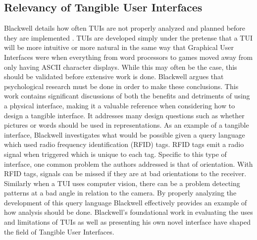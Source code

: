 \subsection{Relevancy of Tangible User Interfaces}

Blackwell details how often TUIs are not properly analyzed and planned before they are implemented \cite{Blackwell}.  TUIs are developed simply under the pretense that a TUI will be more intuitive or more natural in the same way that Graphical User Interfaces were when everything from word processors to games moved away from only having ASCII character displays.  While this may often be the case, this should be validated before extensive work is done.  Blackwell argues that psychological research must be done in order to make these conclusions.   This work contains significant discussions of both the benefits and detriments of using a physical interface, making it a valuable reference when considering how to design a tangible interface.  It addresses many design questions such as whether pictures or words should be used in representations.  As an example of a tangible interface, Blackwell investigates what would be possible given a query language which used radio frequency identification (RFID) tags.  RFID tags emit a radio signal when triggered which is unique to each tag.   Specific to this type of interface, one common problem the authors addressed is that of orientation.  With RFID tags, signals can be missed if they are at bad orientations to the receiver.  Similarly when a TUI uses computer vision, there can be a problem detecting patterns at a bad angle in relation to the camera.  By properly analyzing the development of this query language Blackwell effectively provides an example of how analysis should be done.  Blackwell's foundational work in evaluating the uses and limitations of TUIs as well as presenting his own novel interface have shaped the field of Tangible User Interfaces.


